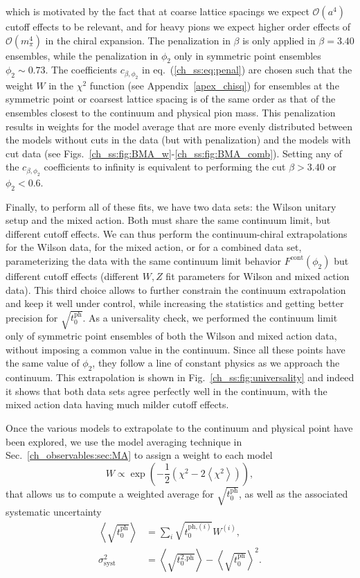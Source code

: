 which is motivated by the fact that at coarse lattice spacings we expect $\mathcal{O}(a^4)$ cutoff effects to be relevant, and for heavy pions we expect higher order effects of $\mathcal{O}(m_{\pi}^4)$ in the chiral expansion. The penalization in $\beta$ is only applied in $\beta=3.40$ ensembles, while the penalization in $\phi_2$ only in symmetric point ensembles $\phi_2\sim0.73$. The coefficients $c_{\beta,\phi_2}$ in eq.~(\ref{ch_ss:eq:penal}) are chosen such that the weight $W$ in the $\chi^2$ function (see Appendix~\ref{apex_chisq}) for ensembles at the symmetric point or coarsest lattice spacing is of the same order as that of the ensembles closest to the continuum and physical pion mass. This penalization results in weights for the model average that are more evenly distributed between the models without cuts in the data (but with penalization) and the models with cut data (see Figs.~\ref{ch_ss:fig:BMA_w}-\ref{ch_ss:fig:BMA_comb}). Setting any of the $c_{\beta,\phi_2}$ coefficients to infinity is equivalent to performing the cut $\beta>3.40$ or $\phi_2<0.6$.

Finally, to perform all of these fits, we have two data sets: the Wilson unitary setup and the mixed action. Both must share the same continuum limit, but different cutoff effects. We can thus perform the continuum-chiral extrapolations for the Wilson data, for the mixed action, or for a combined data set, parameterizing the data with the same continuum limit behavior $F^{\textrm{cont}}(\phi_2)$ but different cutoff effects (different $W,Z$ fit parameters for Wilson and mixed action data). This third choice allows to further constrain the continuum extrapolation and keep it well under control, while increasing the statistics and getting better precision for $\sqrt{t_0^{\textrm{ph}}}$. As a universality check, we performed the continuum limit only of symmetric point ensembles of both the Wilson and mixed action data, without imposing a common value in the continuum. Since all these points have the same value of $\phi_2$, they follow a line of constant physics as we approach the continuum. This extrapolation is shown in Fig.~\ref{ch_ss:fig:universality} and indeed it shows that both data sets agree perfectly well in the continuum, with the mixed action data having much milder cutoff effects.

Once the various models to extrapolate to the continuum and physical point have been explored, we use the model averaging technique in Sec.~\ref{ch_observables:sec:MA} to assign a weight to each model 
\begin{equation}
\label{ch_ss:eq:W}
W\propto\exp\left(-\frac{1}{2}\left(\chi^2-2\left<\chi^2\right>\right)\right),
\end{equation}
that allows us to compute a weighted average for $\sqrt{t_0^{\textrm{ph}}}$, as well as the associated systematic uncertainty
\begin{align}
\left<\sqrt{t_0^{\textrm{ph}}}\right>&=\sum_i\sqrt{t_0^{\textrm{ph,}(i)}}W^{(i)},\\
\sigma^2_{\textrm{syst}}&=\left<\sqrt{t_0^2^{\textrm{,ph}}}\right>-\left<\sqrt{t_0^{\textrm{ph}}}\right>^2.
\end{align}


